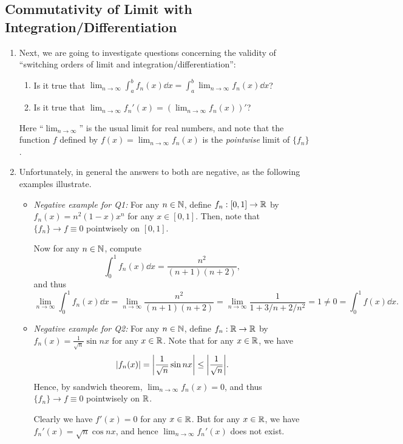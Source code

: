 \subsection{Commutativity of Limit with Integration/Differentiation}
\begin{enumerate}
\item Next, we are going to investigate questions concerning the validity of
``switching orders of limit and integration/differentiation'':
\begin{enumerate}[label={Q\arabic*}]
\item \label{it:switch-int-lim} Is it true that \(\lim_{n\to
\infty}\int_{a}^{b}f_n(x)\dd{x}=\int_{a}^{b}\lim_{n\to \infty}f_n(x)\dd{x}\)?
\item \label{it:switch-diff-lim} Is it true that \(\lim_{n\to
\infty}f_n'(x)=(\lim_{n\to \infty}f_n(x))'\)?
\end{enumerate}
\begin{note}
Here ``\(\lim_{n\to \infty}\)'' is the usual limit for real numbers, and note
that the function \(f\) defined by \(f(x)=\lim_{n\to \infty}f_n(x)\) is the
\emph{pointwise} limit of \(\{f_n\}\).
\end{note}

\item Unfortunately, in general the answers to both
 are negative, as the following
examples illustrate.
\begin{itemize}
\item \emph{Negative example for Q1:} For any \(n\in\mathbb{N}\), define
\(f_n:[0,1]\to\mathbb{R}\) by \(f_n(x)=n^{2}(1-x)x^{n}\) for any \(x\in[0,1]\). Then,
note that \(\{f_n\}\to f\equiv 0\) pointwisely on \([0,1]\).

Now for any \(n\in\mathbb{N}\), compute
\[
\int_{0}^{1}f_n(x)\dd{x}=\frac{n^{2}}{(n+1)(n+2)},
\]
and thus
\[
\lim_{n\to \infty}\int_{0}^{1}f_n(x)\dd{x}
=\lim_{n\to\infty}\frac{n^{2}}{(n+1)(n+2)}
=\lim_{n\to\infty}\frac{1}{1+3/n+2/n^2}
=1\ne 0=\int_{0}^{1}f(x)\dd{x}.
\]
\item \emph{Negative example for Q2:} For any \(n\in\mathbb{N}\), define
\(f_n:\mathbb{R}\to\mathbb{R}\) by \(f_n(x)=\frac{1}{\sqrt{n}}\sin nx\) for any
\(x\in \mathbb{R}\). Note that for any \(x\in\mathbb{R}\), we have
\[
|f_n(x)|=\qty|\frac{1}{\sqrt{n}}\sin nx|\le\qty|\frac{1}{\sqrt{n}}|.
\]
Hence, by sandwich theorem, \(\lim_{n\to \infty}f_n(x)=0\), and thus
\(\{f_n\}\to f\equiv 0\) pointwisely on \(\mathbb{R}\).

Clearly we have \(f'(x)=0\) for any \(x\in\mathbb{R}\). But for any \(x\in\mathbb{R}\), we have
\(f_n'(x)=\sqrt{n}\cos nx\), and hence \(\lim_{n\to \infty}f_n'(x)\) does not
exist.
\end{itemize}


\end{enumerate}
